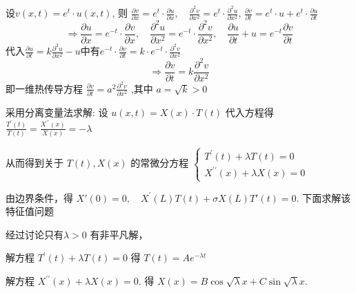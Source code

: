 \begin{questions}
\begin{solution}
设$v(x, t)=e^{t} \cdot u(x, t) $, 则  $\frac{\partial v}{\partial x}=e^{t} \cdot \frac{\partial u}{\partial x}, \quad \frac{\partial^{2} v}{\partial x^{2}}=e^{t} \cdot \frac{\partial^{2} u}{\partial x^{2}}$, \quad $\frac{\partial v}{\partial t}=e^{t} \cdot u+e^{t} \cdot \frac{\partial u}{\partial t}$
$$\Rightarrow \frac{\partial u}{\partial x}=e^{-t} \cdot \frac{\partial v}{\partial x} ,\quad  \frac{\partial^{2} u}{\partial x^{2}}=e^{-t} \cdot \frac{\partial^{2} v}{\partial x^{2}} ,\quad \frac{\partial u}{\partial t}+u=e^{-t} \frac{\partial v}{\partial t} $$
代入$\frac{\partial u}{\partial t}=k \frac{\partial^{2} u}{\partial x^{2}}-u $中有$e^{-t} \cdot \frac{\partial v}{\partial t}=k \cdot e^{-t} \cdot \frac{\partial^{2} v}{\partial x^{2}}$
$$
\Rightarrow \frac{\partial v}{\partial t}=k  \frac{\partial^{2} v}{\partial x^{2}}
$$
即一维热传导方程 $ \frac{\partial v}{\partial t}=a^{2} \frac{\partial^{2} v}{\partial x^{2}} $
,其中 $ a=\sqrt{k} >0 $
\end{solution}
\begin{solution}
采用分离变量法求解: 设 $ u(x, t)=X(x) \cdot T(t) $ 代入方程得 $ \frac{T^{\prime}(t)}{ T(t)}=\frac{X^{\prime \prime}(x)}{X(x)}=-\lambda $ 

从而得到关于 $ T(t) , X(x) $ 的常微分方程
$\left\{\begin{array}{l}
T^{\prime}(t)+\lambda  T(t)=0 \\
X^{\prime \prime}(x)+\lambda X(x)=0
\end{array}\right.$

由边界条件，得 $ X'(0)=0 , \quad X^{\prime}(L)T(t)+\sigma X(L)T'(t)=0 $. 下面求解该特征值问题

 经过讨论只有$ \lambda>0 $ 有非平凡解，

解方程 $ T^{\prime}(t)+\lambda T(t)=0 $ 得 $ T(t)=A e^{-\lambda t} $

解方程 $ X^{\prime \prime}(x)+\lambda X(x)=0 $. 得 $ X(x)=B \cos \sqrt{\lambda} x+C \sin \sqrt{\lambda} x $.


\end{solution}
\end{questions}
